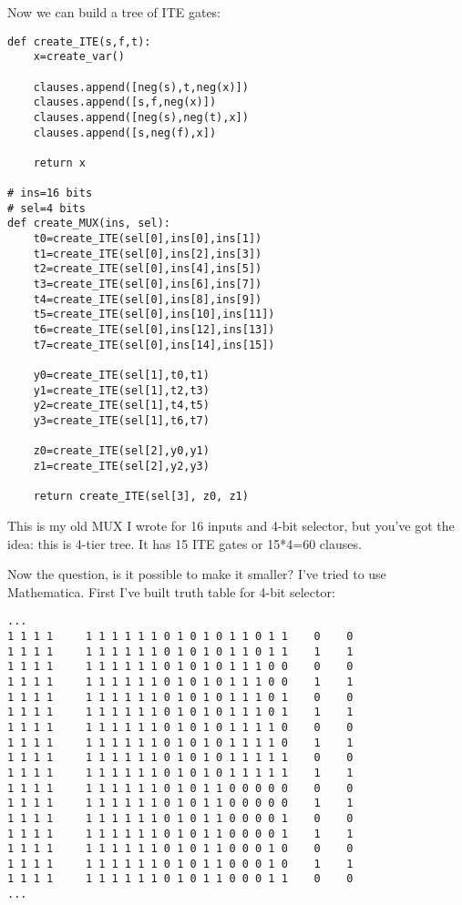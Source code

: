 Now we can build a tree of \ac{ITE} gates:

\begin{lstlisting}[style=custompy]
def create_ITE(s,f,t):
    x=create_var()

    clauses.append([neg(s),t,neg(x)])
    clauses.append([s,f,neg(x)])
    clauses.append([neg(s),neg(t),x])
    clauses.append([s,neg(f),x])

    return x

# ins=16 bits
# sel=4 bits
def create_MUX(ins, sel):
    t0=create_ITE(sel[0],ins[0],ins[1])
    t1=create_ITE(sel[0],ins[2],ins[3])
    t2=create_ITE(sel[0],ins[4],ins[5])
    t3=create_ITE(sel[0],ins[6],ins[7])
    t4=create_ITE(sel[0],ins[8],ins[9])
    t5=create_ITE(sel[0],ins[10],ins[11])
    t6=create_ITE(sel[0],ins[12],ins[13])
    t7=create_ITE(sel[0],ins[14],ins[15])

    y0=create_ITE(sel[1],t0,t1)
    y1=create_ITE(sel[1],t2,t3)
    y2=create_ITE(sel[1],t4,t5)
    y3=create_ITE(sel[1],t6,t7)

    z0=create_ITE(sel[2],y0,y1)
    z1=create_ITE(sel[2],y2,y3)

    return create_ITE(sel[3], z0, z1)
\end{lstlisting}

This is my old MUX I wrote for 16 inputs and 4-bit selector, but you've got the idea: this is 4-tier tree.
It has 15 ITE gates or 15*4=60 clauses.

Now the question, is it possible to make it smaller?
I've tried to use Mathematica.
First I've built truth table for 4-bit selector:

\begin{lstlisting}
...
1 1 1 1     1 1 1 1 1 1 0 1 0 1 0 1 1 0 1 1    0    0
1 1 1 1     1 1 1 1 1 1 0 1 0 1 0 1 1 0 1 1    1    1
1 1 1 1     1 1 1 1 1 1 0 1 0 1 0 1 1 1 0 0    0    0
1 1 1 1     1 1 1 1 1 1 0 1 0 1 0 1 1 1 0 0    1    1
1 1 1 1     1 1 1 1 1 1 0 1 0 1 0 1 1 1 0 1    0    0
1 1 1 1     1 1 1 1 1 1 0 1 0 1 0 1 1 1 0 1    1    1
1 1 1 1     1 1 1 1 1 1 0 1 0 1 0 1 1 1 1 0    0    0
1 1 1 1     1 1 1 1 1 1 0 1 0 1 0 1 1 1 1 0    1    1
1 1 1 1     1 1 1 1 1 1 0 1 0 1 0 1 1 1 1 1    0    0
1 1 1 1     1 1 1 1 1 1 0 1 0 1 0 1 1 1 1 1    1    1
1 1 1 1     1 1 1 1 1 1 0 1 0 1 1 0 0 0 0 0    0    0
1 1 1 1     1 1 1 1 1 1 0 1 0 1 1 0 0 0 0 0    1    1
1 1 1 1     1 1 1 1 1 1 0 1 0 1 1 0 0 0 0 1    0    0
1 1 1 1     1 1 1 1 1 1 0 1 0 1 1 0 0 0 0 1    1    1
1 1 1 1     1 1 1 1 1 1 0 1 0 1 1 0 0 0 1 0    0    0
1 1 1 1     1 1 1 1 1 1 0 1 0 1 1 0 0 0 1 0    1    1
1 1 1 1     1 1 1 1 1 1 0 1 0 1 1 0 0 0 1 1    0    0
...
\end{lstlisting}


